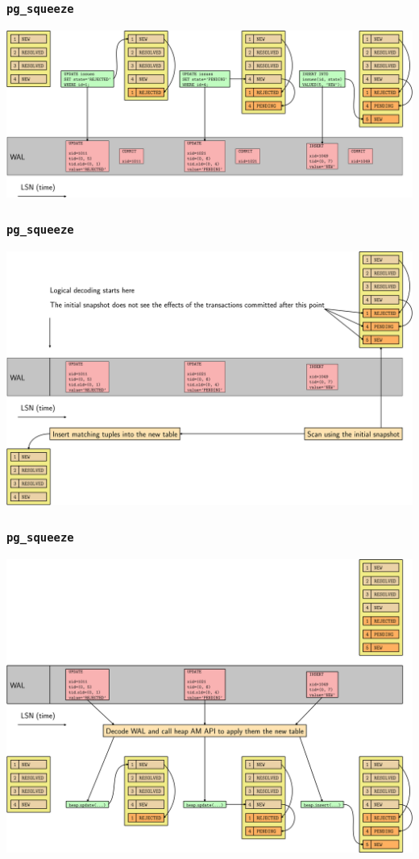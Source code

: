 \begin{frame}
  \frametitle{\texttt{pg\_squeeze}}
  \begin{center}
    \includegraphics[height=\sizeforimages\textheight]{images/pg_squeeze_01.png}
  \end{center}
\end{frame}

\begin{frame}
  \frametitle{\texttt{pg\_squeeze}}
  \begin{center}
    \includegraphics[height=\sizeforimages\textheight]{images/pg_squeeze_02.png}
  \end{center}
\end{frame}

\begin{frame}
  \frametitle{\texttt{pg\_squeeze}}
  \begin{center}
    \includegraphics[height=\sizeforimages\textheight]{images/pg_squeeze_03.png}
  \end{center}
\end{frame}


